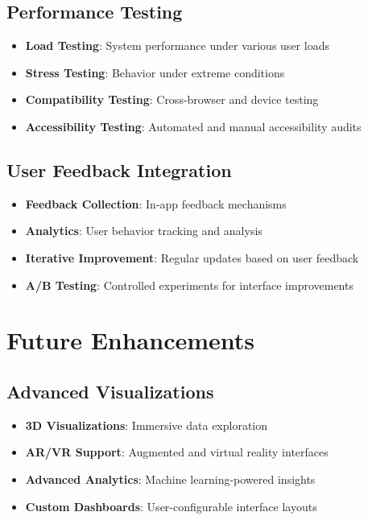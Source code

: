 \subsection{Performance Testing}
\begin{itemize}
\item \textbf{Load Testing}: System performance under various user loads
\item \textbf{Stress Testing}: Behavior under extreme conditions
\item \textbf{Compatibility Testing}: Cross-browser and device testing
\item \textbf{Accessibility Testing}: Automated and manual accessibility audits
\end{itemize}

\subsection{User Feedback Integration}
\begin{itemize}
\item \textbf{Feedback Collection}: In-app feedback mechanisms
\item \textbf{Analytics}: User behavior tracking and analysis
\item \textbf{Iterative Improvement}: Regular updates based on user feedback
\item \textbf{A/B Testing}: Controlled experiments for interface improvements
\end{itemize}


\section{Future Enhancements}

\subsection{Advanced Visualizations}
\begin{itemize}
\item \textbf{3D Visualizations}: Immersive data exploration
\item \textbf{AR/VR Support}: Augmented and virtual reality interfaces
\item \textbf{Advanced Analytics}: Machine learning-powered insights
\item \textbf{Custom Dashboards}: User-configurable interface layouts
\end{itemize}

